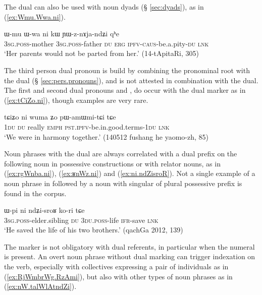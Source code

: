 The dual can also be used with noun dyads (§ \ref{sec:dyads}), as in (\ref{ex:Wmu.Wwa.ni}). 

\begin{exe}
\ex \label{ex:Wmu.Wwa.ni}
\gll   ɯ-mu ɯ-wa ni kɯ ɲɯ-z-nɤja-ndʑi qʰe \\
\textsc{3sg}.\textsc{poss}-mother \textsc{3sg}.\textsc{poss}-father \textsc{du} \textsc{erg} \textsc{ipfv}-\textsc{caus}-be.a.pity-\textsc{du} \textsc{lnk} \\
\glt `Her parents would not be parted from her.' (14-tApitaRi, 305)
\end{exe}

The third person dual pronoun  is build by combining the pronominal root  with the dual  (§ \ref{sec:pers.pronouns}), and is not attested in combination with the dual. The first and second dual pronouns  and , do occur with the dual marker as in (\ref{ex:tCiZo.ni}), though examples are very rare.

\begin{exe}
\ex \label{ex:tCiZo.ni}
\gll  tɕiʑo ni wuma ʑo pɯ-amɯmi-tɕi tɕe \\
\textsc{1du} \textsc{du} really \textsc{emph} \textsc{pst}.\textsc{ipfv}-be.in.good.terms-\textsc{1du} \textsc{lnk} \\
\glt `We were in harmony together.' (140512 fushang he yaomo-zh, 85)
\end{exe}

Noun phrases with the dual  are always correlated with a dual prefix on the following noun in possessive constructions or with relator nouns, as in (\ref{ex:rgWnba.ni}), (\ref{ex:ʁnWz.ni}) and (\ref{ex:ni.ndZisroR}). Not a single example of a noun phrase in  followed by a noun with singular of plural possessive prefix is found in the corpus.

\begin{exe}
\ex \label{ex:ni.ndZisroR} 
\gll ɯ-pi ni ndʑi-sroʁ ko-ri tɕe \\
\textsc{3sg}.\textsc{poss}-elder.sibling \textsc{du} \textsc{3du}.\textsc{poss}-life \textsc{ifr}-save \textsc{lnk} \\
\glt `He saved the life of his two brothers.' (qachGa 2012, 139)
\end{exe}

The marker  is not obligatory with dual referents, in particular when the numeral  is present. An overt noun phrase without dual marking can trigger indexation on the verb, especially with collectives expressing a pair of individuals as  in (\ref{ex:RjWmbrWg.RzAmi}), but also with other types of noun phrases as in (\ref{ex:nW.talWlAtndZi}).

